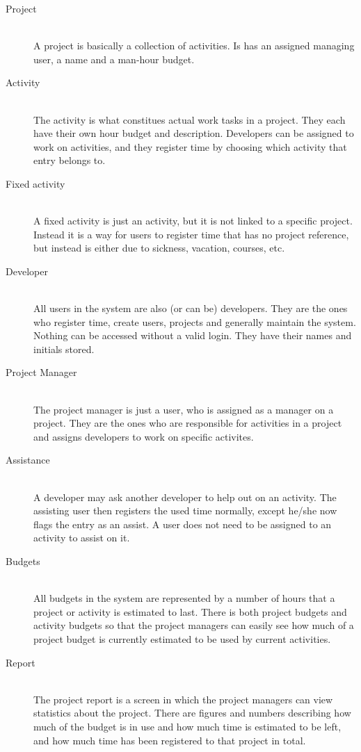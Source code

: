 \begin{description}
\item[Project] \hfill \\
A project is basically a collection of activities. Is has an assigned managing user, a name and a man-hour budget.  

\item[Activity] \hfill \\
The activity is what constitues actual work tasks in a project. They each have their own hour budget and description. Developers can be assigned to work on activities, and they register time by choosing which activity that entry belongs to.

\item[Fixed activity] \hfill \\
A fixed activity is just an activity, but it is not linked to a specific project. Instead it is a way for users to register time that has no project reference, but instead is either due to sickness, vacation, courses, etc.

\item[Developer] \hfill \\
All users in the system are also (or can be) developers. They are the ones who register time, create users, projects and generally maintain the system. Nothing can be accessed without a valid login. They have their names and initials stored.

\item[Project Manager] \hfill \\
The project manager is just a user, who is assigned as a manager on a project. They are the ones who are responsible for activities in a project and assigns developers to work on specific activites.

\item[Assistance] \hfill \\
A developer may ask another developer to help out on an activity. The assisting user then registers the used time normally, except he/she now flags the entry as an assist. A user does not need to be assigned to an activity to assist on it.

\item[Budgets] \hfill \\
All budgets in the system are represented by a number of hours that a project or activity is estimated to last. There is both project budgets and activity budgets so that the project managers can easily see how much of a project budget is currently estimated to be used by current activities.

\item[Report] \hfill \\
The project report is a screen in which the project managers can view statistics about the project. There are figures and numbers describing how much of the budget is in use and how much time is estimated to be left, and how much time has been registered to that project in total.

\end{description}